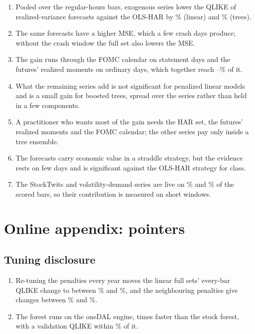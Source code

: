 \begin{enumerate}
\item Pooled over the regular-hours bars, \rhdmNSeriesPooled{} exogenous series lower the QLIKE of realized-variance
  forecasts against the OLS-HAR by \rhorVsOlsRedLinRng\% (linear) and \rhorVsOlsRedTreeRng\% (trees).
\item The same forecasts have a higher MSE, which a few crash days produce; without the crash window the full set
  also lowers the MSE.
\item The gain runs through the FOMC calendar on statement days and the futures' realized moments on ordinary days,
  which together reach \rhabBaseShareMin--\rhabBaseShareMax\% of it.
\item What the remaining \rhbyFLNSeries{} series add is not significant for penalized linear models and is a small gain
  for boosted trees, spread over the series rather than held in a few components.
\item A practitioner who wants most of the gain needs the HAR set, the futures' realized moments and the FOMC calendar;
  the other series pay only inside a tree ensemble.
\item The forecasts carry economic value in a \zdte{} straddle strategy, but the evidence rests on few days and is
  significant against the OLS-HAR strategy for \rhemFullVsOlsSigWord{} class.
\item The StockTwits and volatility-demand series are live on \rhlvStSentEvRange\% and \rhlvVdEvRange\% of the scored
  bars, so their contribution is measured on short windows.
\end{enumerate}

\appendix
\section{Online appendix: pointers}
\label{app:pointers}

\subsection{Tuning disclosure}
\label{sec:rh_methods_hyper}
\begin{enumerate}
\item Re-tuning the penalties every year moves the linear full sets' every-bar QLIKE change to
  between \rhtuAnnPctBarMin\% and \rhtuAnnPctBarMax\%, and the neighbouring penalties give changes between
  \rhtuNbrPctBarMin\% and \rhtuNbrPctBarMax\%.
\item The forest runs on the oneDAL engine, \rhtuRfSpeedup{} times faster than the stock forest, with a validation
  QLIKE within \rhtuRfQlikeDiffPct\% of it.
\end{enumerate}

